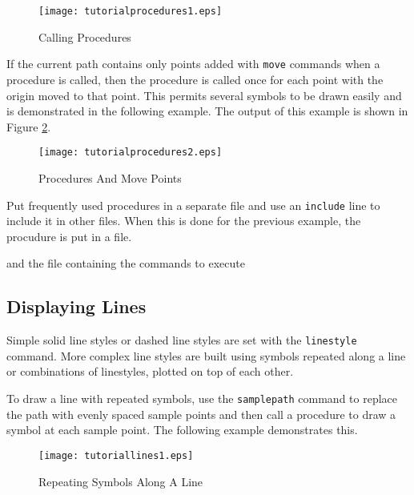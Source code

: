 

\begin{figure}[htb]
\texttt{[image: tutorialprocedures1.eps]}
\caption{Calling Procedures}
\label{tutorialprocedures1}
\end{figure}

If the current path contains only points added with \texttt{move}
commands when a procedure is called, then the
procedure is called once for each point with the origin
moved to that point.  This permits several symbols to be drawn
easily and is demonstrated in the following example.  The 
output of this example is shown in Figure \ref{tutorialprocedures2}.



\begin{figure}[htb]
\texttt{[image: tutorialprocedures2.eps]}
\caption{Procedures And Move Points}
\label{tutorialprocedures2}
\end{figure}


Put frequently used procedures in a separate file and use an
\texttt{include}
line to include it in other files.  When this is done for the
previous example, the procudure is put in a file.



and the file containing the commands to execute



\subsection{Displaying Lines}

Simple solid line styles or dashed line styles
are set with the
\texttt{linestyle} command.  More complex line styles are built using
symbols repeated along a line or combinations of linestyles, plotted
on top of each other.

To draw a line with repeated symbols, use the
\texttt{samplepath}
command to replace the path with evenly spaced sample points and
then call a procedure to draw a symbol at each sample point.
The following example demonstrates this.



\begin{figure}[htb]
\texttt{[image: tutoriallines1.eps]}
\caption{Repeating Symbols Along A Line}
\label{tutoriallines1}
\end{figure}


